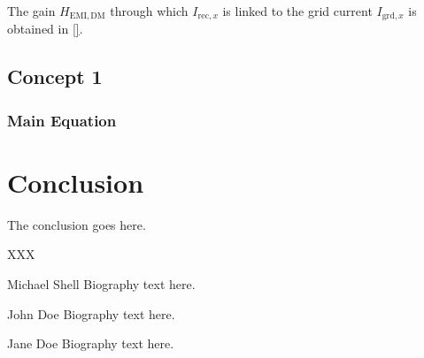 \documentclass[journal,a4paper,10pt,twoside]{IEEEtran} %
\begin{document}
	
	{\color{gray}The gain $H_\mathrm{EMI,DM}$ through which $I_{\mathrm{rec},x}$ is linked to the grid current $I_{\mathrm{grd},x}$ is obtained in \eqref{}.}
	
	
	
	
	
	
	
	
	
	
	\subsection{Concept 1}
	\subsubsection{Main Equation}
	
	
	\section{Conclusion}
	The conclusion goes here.
	
	
	
	
	
	\begin{IEEEbiography}{XXX}
		
	\end{IEEEbiography}
	
	\begin{IEEEbiography}{Michael Shell}
		Biography text here.
	\end{IEEEbiography}
	
	\begin{IEEEbiographynophoto}{John Doe}
		Biography text here.
	\end{IEEEbiographynophoto}


	\begin{IEEEbiographynophoto}{Jane Doe}
		Biography text here.
	\end{IEEEbiographynophoto}
	
\end{document}
